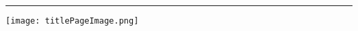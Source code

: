 \maketitle
\thispagestyle{empty}
\vspace{0.5cm}
\hrule
\vspace{1cm}


\FloatBarrier
\begin{figure*}[htp]
	\centering
	\texttt{[image: titlePageImage.png]}
\end{figure*}
\FloatBarrier


\vfill
\newpage

{
	\hypersetup{linkcolor=black}
	\tableofcontents
}

\pagebreak

